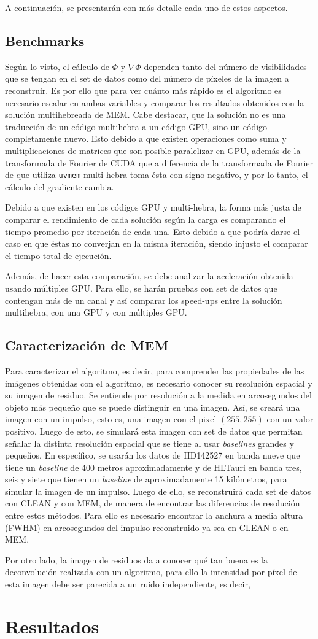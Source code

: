 A continuación, se presentarán con más detalle cada uno de estos aspectos.

\section{Benchmarks}
Según lo visto, el cálculo de $\Phi$ y $\nabla \Phi$ dependen tanto del número de visibilidades que se tengan en el set de datos como del número de píxeles de la imagen a reconstruir. Es por ello que para ver cuánto más rápido es el algoritmo es necesario escalar en ambas variables y comparar los resultados obtenidos con la solución multihebreada de MEM. Cabe destacar, que la solución no es una traducción de un código multihebra a un código GPU, sino un código completamente nuevo. Esto debido a que existen operaciones como suma y multiplicaciones de matrices que son posible paralelizar en GPU, además de la transformada de Fourier de CUDA \citep{cudafft} que a diferencia de la transformada de Fourier de \citep{numericalrecipes} que utiliza \texttt{uvmem} multi-hebra toma ésta con signo negativo, y por lo tanto, el cálculo del gradiente cambia.

Debido a que existen en los códigos GPU y multi-hebra, la forma más justa de comparar el rendimiento de cada solución según la carga es comparando el tiempo promedio por iteración de cada una. Esto debido a que podría darse el caso en que éstas no converjan en la misma iteración, siendo injusto el comparar el tiempo total de ejecución.

Además, de hacer esta comparación, se debe analizar la aceleración obtenida usando múltiples GPU. Para ello, se harán pruebas con set de datos que contengan más de un canal y así comparar los speed-ups entre la solución multihebra, con una GPU y con múltiples GPU.

\section{Caracterización de MEM}

Para caracterizar el algoritmo, es decir, para comprender las propiedades de las imágenes obtenidas con el algoritmo, es necesario conocer su resolución espacial y su imagen de residuo. Se entiende por resolución a la medida en arcosegundos del objeto más pequeño que se puede distinguir en una imagen. Así, se creará una imagen con un impulso, esto es, una imagen con el pixel $(255,255)$ con un valor positivo. Luego de esto, se simulará esta imagen con set de datos que permitan señalar la distinta resolución espacial que se tiene al usar \textit{baselines} grandes y pequeños. En específico, se usarán los datos de HD142527 en banda nueve que tiene un \textit{baseline} de 400 metros aproximadamente y de HLTauri en banda tres, seis y siete que tienen un \textit{baseline} de aproximadamente 15 kilómetros, para simular la imagen de un impulso. Luego de ello, se reconstruirá cada set de datos con CLEAN y con MEM, de manera de encontrar las diferencias de resolución entre estos métodos. Para ello es necesario encontrar la anchura a media altura (FWHM) en arcosegundos del impulso reconstruido ya sea en CLEAN o en MEM.

Por otro lado, la imagen de residuos da a conocer qué tan buena es la deconvolución realizada con un algoritmo, para ello la intensidad por píxel de esta imagen debe ser parecida a un ruido independiente, es decir,
\chapter{Resultados}
\label{cap:resultados}
